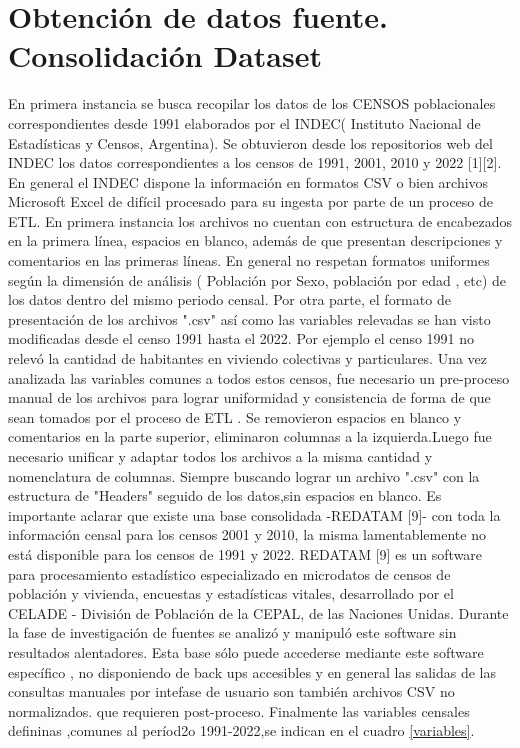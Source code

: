 \documentclass{article}
\theoremstyle{mytheoremstyle}
\theoremstyle{mytheoremstyle}
\theoremstyle{myproblemstyle}
\begin{document}
 \section{Obtención de datos fuente. Consolidación Dataset }
 En primera instancia se busca recopilar los datos de los CENSOS poblacionales 
 correspondientes desde 1991 elaborados por el INDEC( Instituto Nacional de Estadísticas y Censos, Argentina). 
  Se obtuvieron desde los repositorios web del INDEC los datos correspondientes a los censos de  1991, 2001, 2010 y 2022 [1][2].
   En general el INDEC dispone la información en formatos CSV o 
 bien archivos Microsoft Excel  de difícil procesado para su ingesta por parte de un  proceso de ETL. \newline
  En primera instancia los archivos no cuentan con estructura de encabezados en la primera línea, espacios en blanco, además de que 
  presentan descripciones y comentarios en las primeras líneas. En general no respetan formatos uniformes según
  la dimensión de análisis ( Población por Sexo, población por edad , etc) de los datos dentro del mismo periodo censal.
  Por otra parte, el formato de presentación de los  archivos ".csv" así como  las variables relevadas se han 
  visto modificadas desde el censo 1991 hasta el 2022. Por ejemplo el censo 1991 no relevó la cantidad de habitantes
  en viviendo colectivas y particulares.\newline
Una vez analizada las variables comunes a todos estos censos, fue necesario un pre-proceso manual
 de los archivos para lograr uniformidad y consistencia de forma de que sean tomados por el proceso de ETL . Se removieron espacios en blanco y comentarios
en la parte superior, eliminaron columnas a la izquierda.Luego fue necesario unificar y adaptar todos los archivos a la misma
 cantidad y nomenclatura de columnas.
Siempre buscando lograr un archivo ".csv" con la estructura de "Headers"  seguido de los datos,sin espacios en blanco.\newline
Es importante aclarar que existe una base consolidada -REDATAM [9]- con toda la información censal para los censos 2001 y 2010,
 la misma lamentablemente no está disponible para los censos de 1991 y 2022. 
 REDATAM [9] es un software para procesamiento estadístico especializado en microdatos de
  censos de población y vivienda, encuestas y estadísticas vitales,
  desarrollado por el CELADE  -  División de Población de la CEPAL, de las Naciones Unidas.
Durante la fase de investigación de fuentes se analizó y manipuló este software sin resultados alentadores. Esta base sólo puede accederse mediante este software específico
, no disponiendo de back ups accesibles y en general las salidas de las consultas manuales por intefase de usuario son también archivos CSV no normalizados.
que requieren post-proceso.\newline
 Finalmente las variables censales defininas ,comunes al  períod2o 1991-2022,se indican en el cuadro  \ref{variables}.
 
\end{document}

